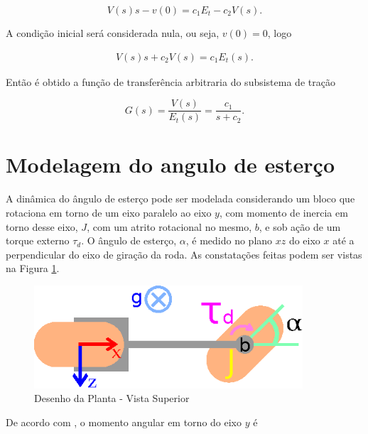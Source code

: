             \begin{equation}
                V(s) s - v(0) = c_1 E_t - c_2 V(s).
            \end{equation}
            
            A condição inicial será considerada nula, ou seja, $v(0) = 0$, logo
            
            \begin{eqnarray}
                V(s) s + c_2 V(s) = c_1 E_t(s).
            \end{eqnarray}
            
            Então é obtido a função de transferência arbitraria do subsistema de tração
            
            \begin{equation}
                G(s)
                = \frac{V(s)}{E_t(s)}
                = \frac{c_1}{s + c_2}.
            \end{equation}
		
	\section{Modelagem do angulo de esterço} \label{sec:modelagemvangulo}
		
		A dinâmica do ângulo de esterço pode ser modelada considerando um bloco que rotaciona em torno de um eixo paralelo ao eixo $y$, com momento de inercia em torno desse eixo, $J$, com um atrito rotacional no mesmo, $b$, e sob ação de um torque externo $\tau _d$. O ângulo de esterço, $\alpha$, é medido no plano $xz$ do eixo $x$ até a perpendicular do eixo de giração da roda. As constatações feitas podem ser vistas na Figura \ref{img:alpha}.
		
		\begin{figure}[h]
            \centering
            \includegraphics[width=10cm]{Imagens/alpha.eps}
            \caption{Desenho da Planta - Vista Superior}
            \label{img:alpha}
        \end{figure}
        
        De acordo com \cite{book:goldstein}, o momento angular em torno do eixo $y$ é
        
